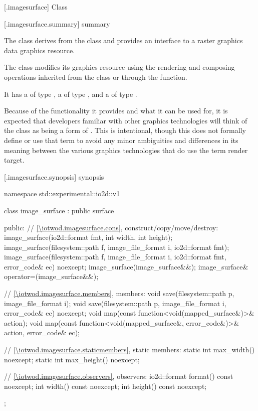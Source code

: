  [\iotwod.imagesurface] {Class }

 [\iotwod.imagesurface.summary] { summary}

\pnum
{}%
The class  derives from the  class and provides an interface to a raster graphics data graphics resource.

\pnum
The  class modifies its graphics resource using the rendering and composing operations inherited from the  class or through the  function.

\pnum
It has a  of type , a  of type , and a  of type .

\pnum
\begin{note}
Because of the functionality it provides and what it can be used for, it is expected that developers familiar with other graphics technologies will think of the  class as being a form of . This is intentional, though this \documenttypename{} does not formally define or use that term to avoid any minor ambiguities and differences in its meaning between the various graphics technologies that do use the term render target.
\end{note}

 [\iotwod.imagesurface.synopsis] { synopsis}

\begin{codeblock}
namespace std::experimental::io2d::v1 {
  class image_surface : public surface {
  public:
    // \ref{\iotwod.imagesurface.cons}, construct/copy/move/destroy:
    image_surface(io2d::format fmt, int width, int height);
    image_surface(filesystem::path f, image_file_format i, 
      io2d::format fmt);
    image_surface(filesystem::path f, image_file_format i, 
      io2d::format fmt, error_code& ec) noexcept;
    image_surface(image_surface&&);
    image_surface& operator=(image_surface&&);
    
    // \ref{\iotwod.imagesurface.members}, members:
    void save(filesystem::path p, image_file_format i);
    void save(filesystem::path p, image_file_format i, error_code& ec) noexcept;
    void map(const function<void(mapped_surface&)>& action);
    void map(const function<void(mapped_surface&, error_code&)>& action,
      error_code& ec);
    
    // \ref{\iotwod.imagesurface.staticmembers}, static members:
    static int max_width() noexcept;
    static int max_height() noexcept;
    
    // \ref{\iotwod.imagesurface.observers}, observers:
    io2d::format format() const noexcept;
    int width() const noexcept;
    int height() const noexcept;
  };
}
\end{codeblock}

